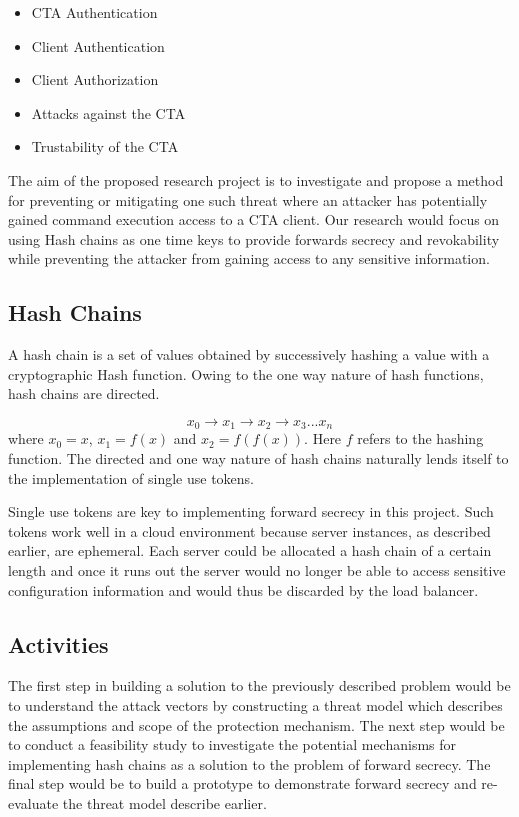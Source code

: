 \documentclass[10pt,conference]{IEEEtran}
\begin{document}
\begin{itemize}
\item CTA Authentication 
\item Client Authentication
\item Client Authorization
\item Attacks against the CTA
\item Trustability of the CTA
\end{itemize}

The aim of the proposed research project is to investigate and propose a method for preventing or 
mitigating one such threat where an attacker has potentially gained command execution access to a 
CTA client. Our research would focus on using Hash chains as one time keys to provide 
forwards secrecy\cite{conti_ripp-fs:_2007} and revokability while preventing the attacker from 
gaining access to any sensitive information.

\subsection{Hash Chains}

A hash chain is a set of values obtained by successively hashing a value with a cryptographic Hash 
function. Owing to the one way nature of hash functions, hash chains are directed.

\begin{equation}
x_0 \rightarrow x_1 \rightarrow x_2 \rightarrow x_3 ... x_n
\end{equation}
 where $x_0 = x$, $x_1 = f(x)$ and $x_2 = f(f(x))$. Here $f$ refers to the hashing function. The 
 directed and one way nature of hash chains naturally lends itself to the implementation of single 
 use tokens. 

Single use tokens are key to implementing forward secrecy in this project. Such tokens work well in 
a cloud environment because server instances, as described earlier, are ephemeral. Each server could 
be allocated a hash chain of a certain length and once it runs out the server would no longer be 
able to access sensitive configuration information and would thus be discarded by the load balancer.

\subsection{Activities}

The first step in building a solution to the previously described problem would be to understand the 
attack vectors by constructing a threat model which describes the assumptions and scope of the 
protection mechanism. The next step would be to conduct a feasibility study to investigate the 
potential mechanisms for implementing hash chains as a solution to the problem of forward secrecy. 
The final step would be to build a prototype to demonstrate forward secrecy and re-evaluate the 
threat model describe earlier.
\end{document}
